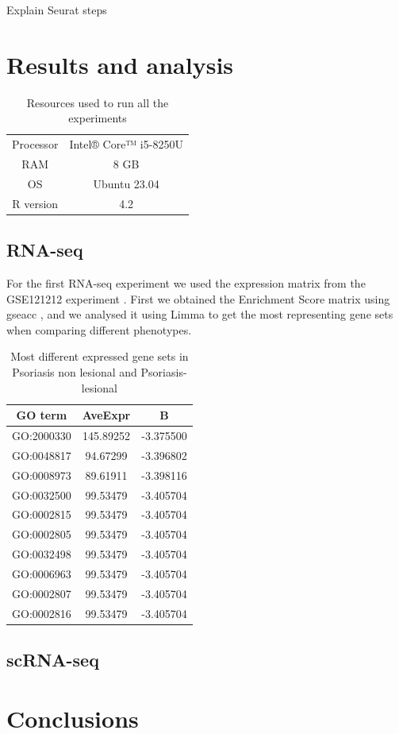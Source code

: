 \documentclass[aps,prb,twocolumn,superscriptaddress,floatfix,longbibliography]{revtex4-2}
\newif\ifptitle
\newif\ifpnumber
\newcounter{para}
\newcommand\ptitle[1]{\par\refstepcounter{para}
{\ifpnumber{\noindent\textcolor{lightgray}{\textbf{\thepara}}\indent}\fi}
{\ifptitle{\textbf{[{#1}]}}\fi}}
\begin{document}
\ptitle{Seurat \cite{seurat-v4} \cite{seurat-web}}

Explain Seurat steps

\section{\label{sec:Results}Results and analysis}

\begin{table}[H]
\centering
\begin{tabular}{ | c | c | }
    \hline
    Processor & Intel® Core™ i5-8250U  \\
    RAM & 8 GB \\
    OS & Ubuntu 23.04 \\
    R version & 4.2 \\
    \hline
\end{tabular}
\caption{Resources used to run all the experiments}
\end{table}


\subsection{RNA-seq}

For the first RNA-seq experiment we used the expression matrix from the GSE121212 experiment \cite{gse121212}. First we obtained the Enrichment Score matrix using gseacc \cite{gse121212-go-es}, and we analysed it using Limma to get the most representing gene sets when comparing different phenotypes.

\begin{table}[H]
\centering
\begin{tabular}{ | c @{\hspace{0.6cm}} c @{\hspace{0.5cm}} c | }
    \hline
    GO term & AveExpr & B \\
    \hline
    \hline
    GO:2000330 & 145.89252 & -3.375500 \\
    GO:0048817 & 94.67299 & -3.396802 \\
    GO:0008973 & 89.61911 & -3.398116 \\
    GO:0032500 & 99.53479 & -3.405704 \\
    GO:0002815 & 99.53479 & -3.405704 \\
    GO:0002805 & 99.53479 & -3.405704 \\
    GO:0032498 & 99.53479 & -3.405704 \\
    GO:0006963 & 99.53479 & -3.405704 \\
    GO:0002807 & 99.53479 & -3.405704 \\
    GO:0002816 & 99.53479 & -3.405704 \\
    \hline
\end{tabular}
\caption{Most different expressed gene sets in Psoriasis non lesional and Psoriasis-lesional}
\end{table}

\subsection{scRNA-seq}



\section{Conclusions}


\end{document}
